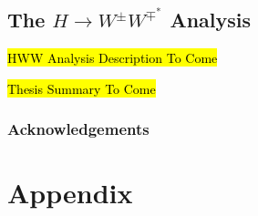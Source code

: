 









% 
\chapter{The $H\rightarrow W^{\pm}W^{\mp^*}$ Analysis}
\label{chap:hww}
\hl{HWW Analysis Description To Come}


\hl{Thesis Summary To Come}

\section*{Acknowledgements}


\clearpage
\appendix
\part*{Appendix}

% 

\printbibliography
% 
% 

